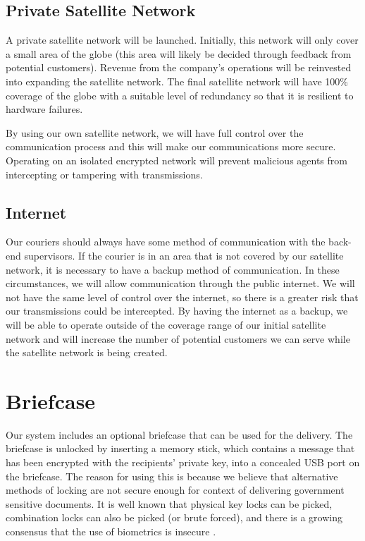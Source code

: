 \subsection{Private Satellite Network} \label{networkarch}
A private satellite network will be launched. Initially, this network will only cover a small area of the globe (this area will likely be decided through feedback from potential customers). Revenue from the company's operations will be reinvested into expanding the satellite network. The final satellite network will have 100\% coverage of the globe with a suitable level of redundancy so that it is resilient to hardware failures.

By using our own satellite network, we will have full control over the communication process and this will make our communications more secure. Operating on an isolated encrypted network will prevent malicious agents from intercepting or tampering with transmissions.

\subsection{Internet}
Our couriers should always have some method of communication with the back-end supervisors. If the courier is in an area that is not covered by our satellite network, it is necessary to have a backup method of communication. In these circumstances, we will allow communication through the public internet. We will not have the same level of control over the internet, so there is a greater risk that our transmissions could be intercepted. By having the internet as a backup, we will be able to operate outside of the coverage range of our initial satellite network and will increase the number of potential customers we can serve while the satellite network is being created.


\section{Briefcase} \label{briefcasearch}
Our system includes an optional briefcase that can be used for the delivery. The briefcase is unlocked by inserting a memory stick, which contains a message that has been encrypted with the recipients' private key, into a concealed USB port on the briefcase. The reason for using this is because we believe that alternative methods of locking are not secure enough for context of delivering government sensitive documents. It is well known that physical key locks can be picked, combination locks can also be picked (or brute forced), and there is a growing consensus that the use of biometrics is insecure \cite{uludag2004biometric} \cite{aviraBiometric} \cite{betaBiometric}.

